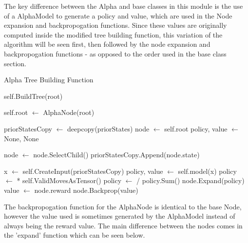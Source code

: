 \documentclass{article}
\makeatletter
\newcommand\subsubsubsubsection{\@startsection{subparagraph}{5}{\z@}{-2.5ex\@plus -1ex \@minus -.25ex}{1.25ex \@plus .25ex}{\normalfont\normalsize\bfseries}}
\makeatother
\begin{document}
    \subsubsubsubsection{Alpha Node and MCTS}
    
    The key difference between the Alpha and base classes in this module is the use of a AlphaModel to
    generate a policy and value, which are used in the Node expansion and backpropogation functions. Since
    these values are originally computed inside the modified tree building function, this variation of the
    algorithm will be seen first, then followed by the node expansion and backpropogation functions - as opposed
    to the order used in the base class section.

    \begin{algorithm} 
        \caption{Alpha Tree Building Function}
        \begin{algorithmic}
                \State self.BuildTree(root) 
                \State \Return
            \EndIf

            \State self.root $\gets$ AlphaNode(root)


                \State priorStatesCopy $\gets$ deepcopy(priorStates)
                \State node $\gets$ self.root
                \State policy, value $\gets$ None, None

                    \State node $\gets$ node.SelectChild()
                    \State priorStatesCopy.Append(node.state)
                \EndWhile

                    \State x $\gets$ self.CreateInput(priorStatesCopy)
                    \State policy, value $\gets$ self.model(x)
                    \State policy $\gets$ * self.ValidMovesAsTensor()
                    \State policy $\gets$ / policy.Sum()
                    \State node.Expand(policy)
                \Else
                    \State value $\gets$ node.reward
                \EndIf
            node.Backprop(value)
            \EndFor
        \EndFunction
        \end{algorithmic}
    \end{algorithm}

    \pagebreak
    \vspace*{10mm}
    The backpropogation function for the AlphaNode is identical to the base Node, however
    the value used is sometimes generated by the AlphaModel instead of always being the
    reward value. The main difference between the nodes comes in the 'expand' function which
    can be seen below.
\end{document}
